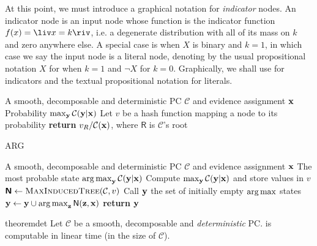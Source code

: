 At this point, we must introduce a graphical notation for \emph{indicator} nodes. An indicator node
is an input node whose function is the indicator function $f(x)=\liv x=k\riv$, i.e. a degenerate
distribution with all of its mass on $k$ and zero anywhere else. A special case is when $X$ is
binary and $k=1$, in which case we say the input node is a literal node, denoting by the usual
propositional notation $X$ for when $k=1$ and $\neg X$ for $k=0$. Graphically, we shall use
\inode{\newLeafNode} for indicators and the textual propositional notation for literals.

\begin{algorithm}[t]
  \caption{\map}\label{alg:map}
  \begin{algorithmic}[1]
    \Require A smooth, decomposable and deterministic PC $\mathcal{C}$ and evidence assignment $\mathbf{x}$
    \Ensure Probability $\max_{\mathbf{y}}\mathcal{C}(\mathbf{y}|\mathbf{x})$
    \State Let $v$ be a hash function mapping a node to its probability
    \EndFor%
    \State \textbf{return} $v_{\normalfont{R}}/\mathcal{C}(\mathbf{x})$, where $\textsf{R}$ is
    $\mathcal{C}$'s root
  \end{algorithmic}
\end{algorithm}
\begin{algorithm}[t]
  \caption{\textsf{ARG}\map}\label{alg:argmap}
  \begin{algorithmic}[1]
    \Require A smooth, decomposable and deterministic PC $\mathcal{C}$ and evidence assignment $\mathbf{x}$
    \Ensure The most probable state $\operatorname*{\normalfont{arg\,max}}_{\mathbf{y}}\mathcal{C}(\mathbf{y}|\mathbf{x})$
    \State Compute $\max_{\mathbf{y}}\mathcal{C}(\mathbf{y}|\mathbf{x})$ and store values in $v$
    \State $\Nodes\gets\textproc{MaxInducedTree}(\mathcal{C}, v)$
    \State Call $\mathbf{y}$ the set of initially empty $\operatorname*{\normalfont{arg\,max}}$ states
      \State $\mathbf{y}\gets\mathbf{y}\cup\operatorname*{\normalfont{arg\,max}}_{\mathbf{z}}\operatorname{\textup{\textsf{N}}}(\mathbf{z},\mathbf{x})$%
    \EndFor%
    \State \textbf{return} $\mathbf{y}$
  \end{algorithmic}
\end{algorithm}

\begin{restatable}{theorem}{det}
  \label{thm:det}
  Let $\mathcal{C}$ be a smooth, decomposable and \emph{deterministic} PC. \map{} is computable in
  linear time (in the size of $\mathcal{C}$).
\end{restatable}


